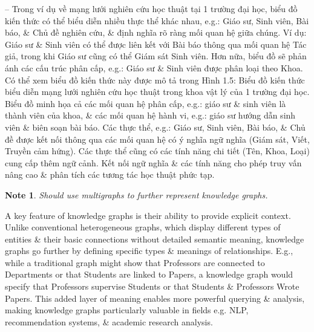 \documentclass{article}
\newtheorem{note}{Note}
\begin{document}
\begin{itemize}
\begin{itemize}
\begin{itemize}
\begin{itemize}
                -- Trong ví dụ về mạng lưới nghiên cứu học thuật tại 1 trường đại học, biểu đồ kiến thức có thể biểu diễn nhiều thực thể khác nhau, e.g.: Giáo sư, Sinh viên, Bài báo, \& Chủ đề nghiên cứu, \& định nghĩa rõ ràng mối quan hệ giữa chúng. Ví dụ: Giáo sư \& Sinh viên có thể được liên kết với Bài báo thông qua mối quan hệ Tác giả, trong khi Giáo sư cũng có thể Giám sát Sinh viên. Hơn nữa, biểu đồ sẽ phản ánh các cấu trúc phân cấp, e.g.: Giáo sư \& Sinh viên được phân loại theo Khoa. Có thể xem biểu đồ kiến thức này được mô tả trong {\sf Hình 1.5: Biểu đồ kiến thức biểu diễn mạng lưới nghiên cứu học thuật trong khoa vật lý của 1 trường đại học. Biểu đồ minh họa cả các mối quan hệ phân cấp, e.g.: giáo sư \& sinh viên là thành viên của khoa, \& các mối quan hệ hành vi, e.g.: giáo sư hướng dẫn sinh viên \& biên soạn bài báo. Các thực thể, e.g.: Giáo sư, Sinh viên, Bài báo, \& Chủ đề được kết nối thông qua các mối quan hệ có ý nghĩa ngữ nghĩa (Giám sát, Viết, Truyền cảm hứng). Các thực thể cũng có các tính năng chi tiết (Tên, Khoa, Loại) cung cấp thêm ngữ cảnh. Kết nối ngữ nghĩa \& các tính năng cho phép truy vấn nâng cao \& phân tích các tương tác học thuật phức tạp.}
                \begin{note}
                    Should use multigraphs to further represent knowledge graphs.
                \end{note}
                A key feature of knowledge graphs is their ability to provide explicit context. Unlike conventional heterogeneous graphs, which display different types of entities \& their basic connections without detailed semantic meaning, knowledge graphs go further by defining specific types \& meanings of relationships. E.g., while a traditional graph might show that Professors are connected to Departments or that Students are linked to Papers, a knowledge graph would specify that Professors supervise Students or that Students \& Professors Wrote Papers. This added layer of meaning enables more powerful querying \& analysis, making knowledge graphs particularly valuable in fields e.g. NLP, recommendation systems, \& academic research analysis.


\end{itemize}
\end{itemize}
\end{itemize}
\end{itemize}
\end{document}
